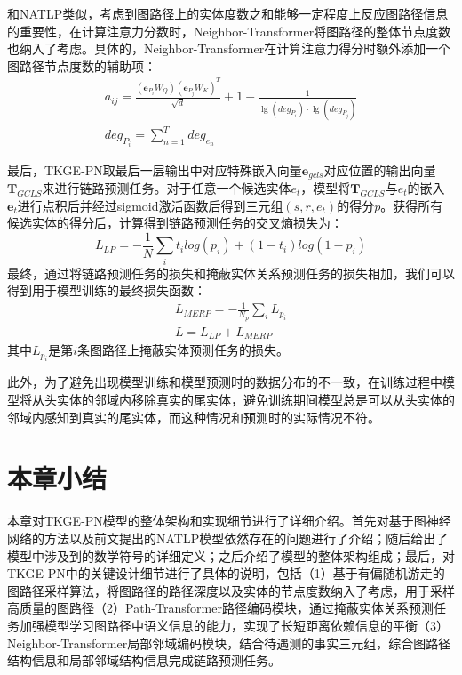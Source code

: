 和NATLP类似，考虑到图路径上的实体度数之和能够一定程度上反应图路径信息的重要性，在计算注意力分数时，Neighbor-Transformer将图路径的整体节点度数也纳入了考虑。具体的，Neighbor-Transformer在计算注意力得分时额外添加一个图路径节点度数的辅助项：
\begin{gather}
  a_{ij}=\frac{(\boldsymbol{e}_{P_i}W_Q)(\boldsymbol{e}_{P_j}W_K)^T}{\sqrt{d}}+1-\frac{1}{\lg (deg_{P_i})\cdot \lg (deg_{P_j})}\\
  deg_{P_i}=\sum_{n = 1}^{T}  deg_{e_n}
\end{gather}

最后，TKGE-PN取最后一层输出中对应特殊嵌入向量$\boldsymbol{e}_{gcls}$对应位置的输出向量$\boldsymbol{T}_{GCLS}$来进行链路预测任务。对于任意一个候选实体$e_t$，模型将$\boldsymbol{T}_{GCLS}$与$e_t$的嵌入$\boldsymbol{e}_{t}$进行点积后并经过sigmoid激活函数后得到三元组$(s,r,e_t)$的得分$p$。获得所有候选实体的得分后，计算得到链路预测任务的交叉熵损失为：
\begin{equation}
  L_{LP} = -\frac{1}{N}\sum\limits_{i}t_ilog(p_i)+(1-t_i)log(1-p_i)
\end{equation}
最终，通过将链路预测任务的损失和掩蔽实体关系预测任务的损失相加，我们可以得到用于模型训练的最终损失函数：
\begin{gather}
  L_{MERP} = -\frac{1}{N_p}\sum\limits_{i}L_{p_{i}}\\
  L=L_{LP}+L_{MERP}
\end{gather}
其中$L_{p_{i}}$是第$i$条图路径上掩蔽实体预测任务的损失。

此外，为了避免出现模型训练和模型预测时的数据分布的不一致，在训练过程中模型将从头实体的邻域内移除真实的尾实体，避免训练期间模型总是可以从头实体的邻域内感知到真实的尾实体，而这种情况和预测时的实际情况不符。


\section{本章小结}

本章对TKGE-PN模型的整体架构和实现细节进行了详细介绍。首先对基于图神经网络的方法以及前文提出的NATLP模型依然存在的问题进行了介绍；随后给出了模型中涉及到的数学符号的详细定义；之后介绍了模型的整体架构组成；最后，对TKGE-PN中的关键设计细节进行了具体的说明，包括（1）基于有偏随机游走的图路径采样算法，将图路径的路径深度以及实体的节点度数纳入了考虑，用于采样高质量的图路径（2）Path-Transformer路径编码模块，通过掩蔽实体关系预测任务加强模型学习图路径中语义信息的能力，实现了长短距离依赖信息的平衡（3）Neighbor-Transformer局部邻域编码模块，结合待遇测的事实三元组，综合图路径结构信息和局部邻域结构信息完成链路预测任务。
